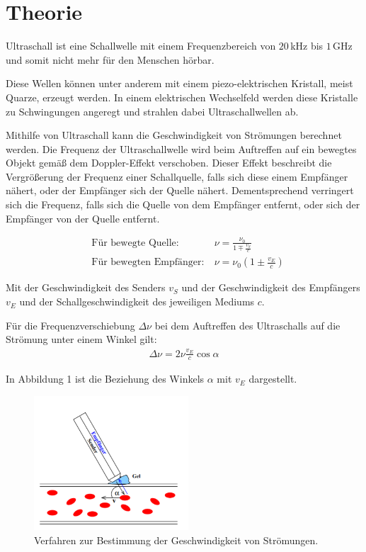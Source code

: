 \section{Theorie}
\label{sec:Theorie}

Ultraschall ist eine Schallwelle mit einem Frequenzbereich von $20\,$kHz bis $1\,$GHz und somit nicht mehr für den
Menschen hörbar.

Diese Wellen können unter anderem mit einem piezo-elektrischen Kristall, meist Quarze, erzeugt werden. In einem elektrischen Wechselfeld werden
diese Kristalle zu Schwingungen angeregt und strahlen dabei Ultraschallwellen ab.

Mithilfe von Ultraschall kann die Geschwindigkeit von Strömungen berechnet werden. Die Frequenz der Ultraschallwelle wird beim Auftreffen auf ein bewegtes Objekt
gemäß dem Doppler-Effekt verschoben. Dieser Effekt beschreibt die Vergrößerung der Frequenz einer Schallquelle, falls sich diese einem Empfänger nähert, oder der
Empfänger sich der Quelle nähert. Dementsprechend verringert sich die Frequenz, falls sich die Quelle von dem Empfänger entfernt, oder sich
der Empfänger von der Quelle entfernt.

\begin{align}
  &\text{Für bewegte Quelle:} \: &\nu = \frac{\nu_0}{1 \mp \frac{v_S}{c}} \\
  &\text{Für bewegten Empfänger:} \: &\nu = \nu_0 \left(1 \pm \frac{v_E}{c}  \right)
\end{align}

Mit der Geschwindigkeit des Senders $v_S$ und der Geschwindigkeit des Empfängers $v_E$ und der Schallgeschwindigkeit des jeweiligen Mediums $c$.

Für die Frequenzverschiebung $\Delta \nu$ bei dem Auftreffen des Ultraschalls auf die Strömung unter einem Winkel gilt:
\begin{align}
  \Delta \nu = 2\nu \frac{v_E}{c}\cos{\alpha}
\end{align}

In Abbildung 1 ist die Beziehung des Winkels $\alpha$ mit $v_E$ dargestellt.

\begin{figure}[H]
  \centering
  \includegraphics[height=5cm]{winkel.PNG}
  \caption{Verfahren zur Bestimmung der Geschwindigkeit von Strömungen. \cite{sample}}
  \label{fig:Linienspektrum}
\end{figure}
